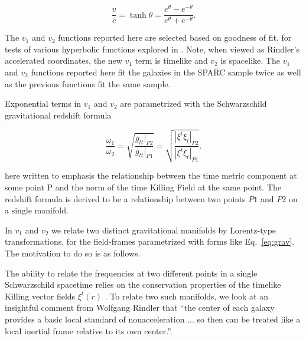 \documentclass[reprint,%
 amsmath,amssymb,
 aps,
]{revtex4-1}
\begin{document}
     \begin{equation}
         \frac{v}{c} = \tanh \theta = \frac{e^\theta - e^{-\theta}}{e^\theta + e^{-\theta}} .   
         \label{boost}
     \end{equation} 

 The  $v_1$ and $v_2$ functions reported here are selected based on goodness of fit, for tests of various hyperbolic functions  explored in   \cite{Cisneros:2013vha,Cisneros:2014fea,Cisneros2015,Cisn2016}. Note, when viewed as    Rindler's accelerated coordinates\cite{MTW,Wald, rindler2013essential}, the new $v_1$ term is  timelike   and $v_2$ is spacelike. 
 The  $v_1$ and $v_2$  functions 
 reported here fit the galaxies in the SPARC sample twice as well as the previous functions fit the same sample. 
 
 
  
Exponential terms in  $v_1$ and $v_2$ are parametrized with the    Schwarzschild gravitational redshift formula

\begin{equation}
       \frac{\omega_1}{\omega_2}  =\sqrt{\frac{g_{tt}|_{P2}}{g_{tt}|_{P1}}} =\sqrt{\frac{|\xi^t\xi_{t}|_{P2}}{|\xi^t\xi_{t}|_{P1}}}.
      \label{eq:grav}
    \end{equation} 
    
    here written to emphasis the relationship between the time metric component at some point P and the norm of the time Killing Field at the same point. The redshift formula is derived to be  a relationship between two points $P1$ and $P2$ on a single manifold. 
    
In $v_1$ and $v_2$ we relate two distinct gravitational manifolds by  Lorentz-type transformations, for the field-frames parametrized with forms like Eq.~\ref{eq:grav}. The motivation to do so is as follows. 



 

  The ability to relate the frequencies at two different points in a single Schwarzschild spacetime relies on  the conservation properties of  the timelike  Killing vector fields  
   $\xi^t(r)$  \cite{Wald}. 
To relate two such   manifolds,  we look at an insightful comment  from   Wolfgang Rindler   that    ``the center of each galaxy provides a basic local standard of nonacceleration ... so then can be treated like a local inertial frame relative to its own center.''\cite{rindler2013essential}.
\end{document}
